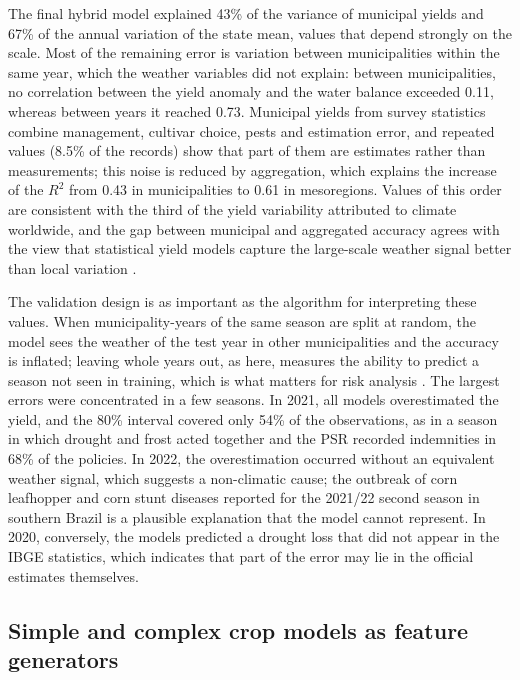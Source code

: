 \documentclass[10pt,a4paper]{article}
\begin{document}
The final hybrid model explained 43\% of the variance of municipal yields and 67\% of the annual variation
of the state mean, values that depend strongly on the scale. Most of the remaining error is variation
between municipalities within the same year, which the weather variables did not explain: between
municipalities, no correlation between the yield anomaly and the water balance exceeded 0.11, whereas
between years it reached 0.73. Municipal yields from survey statistics combine management, cultivar choice,
pests and estimation error, and repeated values (8.5\% of the records) show that part of them are estimates
rather than measurements; this noise is reduced by aggregation, which explains the increase of the $R^2$
from 0.43 in municipalities to 0.61 in mesoregions. Values of this order are consistent with the third of
the yield variability attributed to climate worldwide, and the gap between municipal and aggregated
accuracy agrees with the view that statistical yield models capture the large-scale weather signal better
than local variation \citep{ray2015, lobell2010}.

The validation design is as important as the algorithm for interpreting these values. When
municipality-years of the same season are split at random, the model sees the weather of the test year
in other municipalities and the accuracy is inflated; leaving whole years out, as here, measures the
ability to predict a season not seen in training, which is what matters for risk analysis
\citep{roberts2017, kapoor2023}. The largest errors were concentrated in a few seasons. In 2021, all models
overestimated the yield, and the 80\% interval covered only 54\% of the observations, as in a season in
which drought and frost acted together and the PSR recorded indemnities in 68\% of the policies. In 2022,
the overestimation occurred without an equivalent weather signal, which suggests a non-climatic cause; the
outbreak of corn leafhopper and corn stunt diseases reported for the 2021/22 second season in southern
Brazil is a plausible explanation that the model cannot represent. In 2020, conversely, the models predicted
a drought loss that did not appear in the IBGE statistics, which indicates that part of the error may lie
in the official estimates themselves.

\subsection{Simple and complex crop models as feature generators}
\label{subsec:dis_models}
\end{document}
